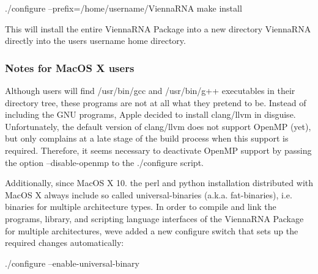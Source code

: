 \begin{DoxyVerb}./configure --prefix=/home/username/ViennaRNA
make install
\end{DoxyVerb}


This will install the entire Vienna\+R\+NA Package into a new directory Vienna\+R\+NA directly into the users username home directory.\hypertarget{install_macosx_notes}{}\subsubsection{Notes for Mac\+O\+S X users}\label{install_macosx_notes}
Although users will find /usr/bin/gcc and /usr/bin/g++ executables in their directory tree, these programs are not at all what they pretend to be. Instead of including the G\+NU programs, Apple decided to install clang/llvm in disguise. Unfortunately, the default version of clang/llvm does not support Open\+MP (yet), but only complains at a late stage of the build process when this support is required. Therefore, it seems necessary to deactivate Open\+MP support by passing the option --disable-\/openmp to the ./configure script.

Additionally, since Mac\+OS X 10. the perl and python installation distributed with Mac\+OS X always include so called universal-\/binaries (a.\+k.\+a. fat-\/binaries), i.\+e. binaries for multiple architecture types. In order to compile and link the programs, library, and scripting language interfaces of the Vienna\+R\+NA Package for multiple architectures, we\textquotesingle{}ve added a new configure switch that sets up the required changes automatically\+:

\begin{DoxyVerb}./configure --enable-universal-binary
\end{DoxyVerb}


